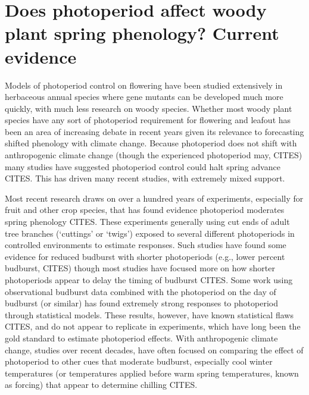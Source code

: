 \documentclass[11pt]{article}
\begin{document}

\section*{Does photoperiod affect woody plant spring phenology? Current evidence} 

Models of photoperiod control on flowering have been studied extensively in herbaceous annual species where gene mutants can be developed much more quickly, with much less research on woody species. Whether most woody plant species have any sort of photoperiod requirement for flowering and leafout has been an area of increasing debate in recent years given its relevance to forecasting shifted phenology with climate change. Because photoperiod does not shift with anthropogenic climate change (though the experienced photoperiod may, CITES) many studies have suggested photoperiod control could halt spring advance CITES. This has driven many recent studies, with extremely mixed support. 

Most recent research draws on over a hundred years of experiments, especially for fruit and other crop species, that has found evidence photoperiod moderates spring phenology CITES.  These experiments generally using cut ends of adult tree branches (`cuttings' or `twigs') exposed to several different photoperiods in controlled environments to estimate responses. Such studies have found some evidence for reduced budburst with shorter photoperiods (e.g., lower percent budburst, CITES) though most studies have focused more on how shorter photoperiods appear to delay the timing of budburst CITES. Some work using observational budburst data combined with the photoperiod on the day of budburst (or similar) has found extremely strong responses to photoperiod through statistical models. These results, however, have known statistical flaws CITES, and do not appear to replicate in experiments, which have long been the gold standard to estimate photoperiod effects. With anthropogenic climate change, studies over recent decades, have often focused on comparing the effect of photoperiod to other cues that moderate budburst, especially cool winter temperatures (or temperatures applied before warm spring temperatures, known as forcing) that appear to determine chilling CITES. 
\end{document}
